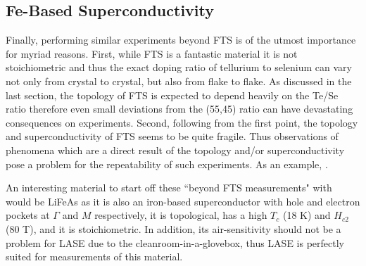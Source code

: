 \subsection{Fe-Based Superconductivity}
Finally, performing similar experiments beyond \ac{FTS} is of the utmost importance for myriad reasons. First, while \ac{FTS} is a fantastic material it is not stoichiometric and thus the exact doping ratio of tellurium to selenium can vary not only from crystal to crystal, but also from flake to flake. As discussed in the last section, the topology of \ac{FTS} is expected to depend heavily on the Te/Se ratio therefore even small deviations from the (55,45) ratio can have devastating consequences on experiments. Second, following from the first point, the topology and superconductivity of \ac{FTS} seems to be quite fragile. Thus observations of phenomena which are a direct result of the topology and/or superconductivity pose a problem for the repeatability of such experiments. As an example, .\par
An interesting material to start off these ``beyond \ac{FTS} measurements" with would be LiFeAs as it is also an iron-based superconductor with hole and electron pockets at $\Gamma$ and $M$ respectively, it is topological, has a high $T_{c}$ (18 K) and $H_{c2}$ (80 T), and it is stoichiometric\cite{Nag2016, Zhang2019_2, Tapp2008}. In addition, its air-sensitivity should not be a problem for LASE due to the cleanroom-in-a-glovebox, thus LASE is perfectly suited for measurements of this material. 